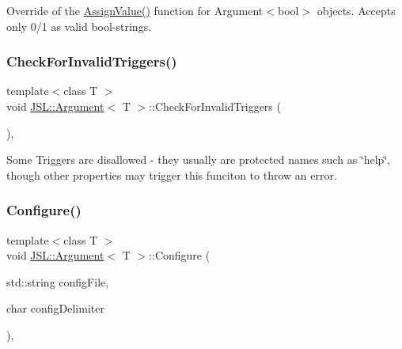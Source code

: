 Override of the \hyperlink{classJSL_1_1Argument_ac77530598054943c996dbb5fb677b844}{Assign\+Value()} function for Argument$<$bool$>$ objects. Accepts only 0/1 as valid bool-\/strings. 

\mbox{\label{classJSL_1_1Argument_a8614eb66f807132c4323847e05e666c4}} 
\subsubsection{\texorpdfstring{Check\+For\+Invalid\+Triggers()}{CheckForInvalidTriggers()}}
{\footnotesize\ttfamily template$<$class T $>$ \\
void \hyperlink{classJSL_1_1Argument}{J\+S\+L\+::\+Argument}$<$ T $>$\+::Check\+For\+Invalid\+Triggers (\begin{DoxyParamCaption}{ }\end{DoxyParamCaption})\hspace{0.3cm}{\ttfamily [inline]}, {\ttfamily [private]}}



Some Triggers are disallowed -\/ they usually are protected names such as \char`\"{}help\char`\"{}, though other properties may trigger this funciton to throw an error. 

\mbox{\label{classJSL_1_1Argument_aa626ff37dbebaf0501614dc625a76383}} 
\subsubsection{\texorpdfstring{Configure()}{Configure()}}
{\footnotesize\ttfamily template$<$class T $>$ \\
void \hyperlink{classJSL_1_1Argument}{J\+S\+L\+::\+Argument}$<$ T $>$\+::Configure (\begin{DoxyParamCaption}\item[{std\+::string}]{config\+File,  }\item[{char}]{config\+Delimiter }\end{DoxyParamCaption})\hspace{0.3cm}{\ttfamily [inline]}, {\ttfamily [virtual]}}



